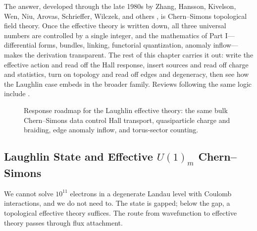 The answer, developed through the late 1980s by Zhang, Hansson, Kivelson, Wen, Niu, Arovas, Schrieffer, Wilczek, and others \cite{ZhangHanssonKivelson1989FQHE,ArovasSchriefferWilczek1984FractionalStatistics,Wen1990TopologicalOrders,WenNiu1990GroundStateDegeneracy}, is Chern--Simons topological field theory. Once the effective theory is written down, all three universal numbers are controlled by a single integer, and the mathematics of Part I---differential forms, bundles, linking, functorial quantization, anomaly inflow---makes the derivation transparent. The rest of this chapter carries it out: write the effective action and read off the Hall response, insert sources and read off charge and statistics, turn on topology and read off edges and degeneracy, then see how the Laughlin case embeds in the broader family. Reviews following the same logic include \cite{Wen1995TopologicalOrdersEdgeExcitations,Stern2008AnyonsQHEReview,NayakSimonSternFreedmanDasSarma2008NonabelianAnyons,HalperinSternNederRosenow2011FractionalCharge,TongQuantumHallLectures,HalperinJain2020FQHENewDevelopments}.

\begin{figure}[h]
    \centering
    
    \caption{Response roadmap for the Laughlin effective theory: the same bulk Chern--Simons data control Hall transport, quasiparticle charge and braiding, edge anomaly inflow, and torus-sector counting.}
    \label{fig:fqhe-response-overview}
\end{figure}

\subsection{Laughlin State and Effective $U(1)_m$ Chern--Simons}
\label{subsec:laughlin-to-cs}

We cannot solve $10^{11}$ electrons in a degenerate Landau level with Coulomb interactions, and we do not need to. The state is gapped; below the gap, a topological effective theory suffices. The route from wavefunction to effective theory passes through flux attachment.

